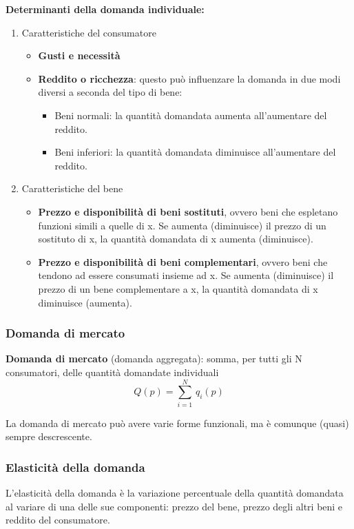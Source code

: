 \documentclass[../main.tex]{subfiles}
\begin{document}
\textbf{Determinanti della domanda individuale:}
\begin{enumerate}
\item Caratteristiche del consumatore
	\begin{itemize}
	\item \textbf{Gusti e necessità}
	\item \textbf{Reddito o ricchezza}: questo può influenzare la domanda in due modi diversi a seconda del tipo di bene:
		\begin{itemize}
		\item Beni normali: la quantità domandata aumenta all'aumentare del reddito.
		\item Beni inferiori: la quantità domandata diminuisce all'aumentare del reddito.
		\end{itemize}
	\end{itemize}
\item Caratteristiche del bene
	\begin{itemize}
	\item \textbf{Prezzo e disponibilità di beni sostituti}, ovvero beni che espletano funzioni simili a quelle di x. Se aumenta (diminuisce) il prezzo di un sostituto di x, la quantità domandata di x aumenta (diminuisce).
	\item \textbf{Prezzo e disponibilità di beni complementari}, ovvero beni che tendono ad essere consumati insieme ad x. Se aumenta (diminuisce) il prezzo di un bene complementare a x, la quantità domandata di x diminuisce (aumenta).
	\end{itemize}
\end{enumerate}

\subsubsection{Domanda di mercato}

\textbf{Domanda di mercato} (domanda aggregata): somma, per tutti gli N consumatori, delle quantità domandate individuali
$$Q(p) = \sum_{i=1}^N\,q_i(p)$$

La domanda di mercato può avere varie forme funzionali, ma è comunque (quasi) sempre descrescente.

\subsubsection{Elasticità della domanda}

L'elasticità della domanda è la variazione percentuale della quantità domandata al variare di una delle sue componenti: prezzo del bene, prezzo degli altri beni e reddito del consumatore.
\end{document}

